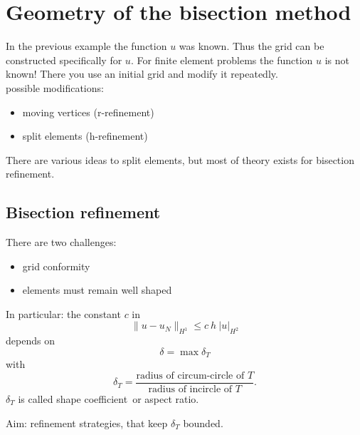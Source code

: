 
\chapter{Geometry of the bisection method}
In the previous example the function $u$ was known. Thus the grid can be constructed specifically for $u$. For finite element problems the function $u $ is not known! There you use an initial grid and modify it repeatedly.\\
possible modifications:
\begin{itemize}
	\item moving vertices (r-refinement)
	\item split elements (h-refinement)
\end{itemize} 
There are various ideas to split elements, but most of theory exists for bisection refinement.
\section{Bisection refinement}


There are two challenges:
\begin{itemize}
	\item grid conformity
	
	\item elements must remain \glqq well shaped\grqq 
	
\end{itemize} 
In particular: the constant $c$ in 
\begin{equation*}
	\|u - u_{N}\|_{H^{1}} \leq c\ h\ |u|_{H^{2}}
\end{equation*} 
depends on 
\begin{equation*}
	\delta = \max \delta_{T} 
\end{equation*} 
with
\begin{equation*}
	\delta_{T}= \frac{\text{radius of circum-circle of }T}{\text{radius of incircle of }T}.
\end{equation*} 
$\delta_{T}$ is called \glqq shape coefficient\grqq\ or \glqq aspect ratio\grqq.\\
\par 
Aim: refinement strategies, that keep $\delta_{T}$ bounded.

